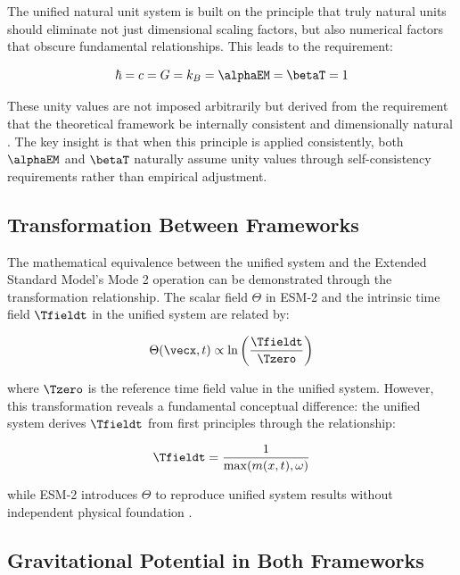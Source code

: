 	The unified natural unit system is built on the principle that truly natural units should eliminate not just dimensional scaling factors, but also numerical factors that obscure fundamental relationships. This leads to the requirement:
	
	\begin{equation}
		\hbar = c = G = k_B = \alphaEM = \betaT = 1
	\end{equation}
	
	These unity values are not imposed arbitrarily but derived from the requirement that the theoretical framework be internally consistent and dimensionally natural \cite{pascher_beta_derivation_2025}. The key insight is that when this principle is applied consistently, both $\alphaEM$ and $\betaT$ naturally assume unity values through self-consistency requirements rather than empirical adjustment.
	
	\subsection{Transformation Between Frameworks}
	\label{subsec:transformation}
	
	The mathematical equivalence between the unified system and the Extended Standard Model's Mode 2 operation can be demonstrated through the transformation relationship. The scalar field $\Theta$ in ESM-2 and the intrinsic time field $\Tfieldt$ in the unified system are related by:
	
	\begin{equation}
		\Theta(\vecx,t) \propto \ln\left(\frac{\Tfieldt}{\Tzero}\right)
	\end{equation}
	
	where $\Tzero$ is the reference time field value in the unified system. However, this transformation reveals a fundamental conceptual difference: the unified system derives $\Tfieldt$ from first principles through the relationship:
	
	\begin{equation}
		\Tfieldt = \frac{1}{\max(m(x,t), \omega)}
	\end{equation}
	
	while ESM-2 introduces $\Theta$ to reproduce unified system results without independent physical foundation \cite{pascher_lagrangian_2025}.
	
	\subsection{Gravitational Potential in Both Frameworks}
	\label{subsec:gravitational_potential}
	
